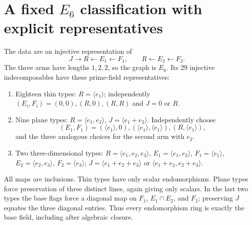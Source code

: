 \documentclass[11pt]{article}
\begin{document}
\section{A fixed $E_6$ classification with explicit representatives}
The data are an injective representation of
\[
 J\longrightarrow R\longleftarrow E_1\longleftarrow F_1,
 \qquad R\longleftarrow E_2\longleftarrow F_2.\tag{4}
\]
The three arms have lengths $1,2,2$, so the graph is $E_6$.
Its 29 injective indecomposables have these prime-field representatives:
\begin{enumerate}
\item Eighteen thin types: $R=\langle e_1\rangle$; independently
$(E_i,F_i)=(0,0),(R,0),(R,R)$ and $J=0$ or $R$.
\item Nine plane types: $R=\langle e_1,e_2\rangle$,
$J=\langle e_1+e_2\rangle$. Independently choose
\[
 (E_1,F_1)=(\langle e_1\rangle,0),
 (\langle e_1\rangle,\langle e_1\rangle),
 (R,\langle e_1\rangle),
\]
and the three analogous choices for the second arm with $e_2$.
\item Two three-dimensional types: $R=\langle e_1,e_2,e_3\rangle$,
$E_1=\langle e_1,e_2\rangle$, $F_1=\langle e_1\rangle$,
$E_2=\langle e_2,e_3\rangle$, $F_2=\langle e_3\rangle$;
$J=\langle e_1+e_2+e_3\rangle$ or
$\langle e_1+e_2,e_2+e_3\rangle$.
\end{enumerate}
All maps are inclusions. Thin types have only scalar endomorphisms.
Plane types force preservation of three distinct lines, again giving
only scalars. In the last two types the base flags force a diagonal map
on $F_1$, $E_1\cap E_2$, and $F_2$; preserving $J$ equates the three
diagonal entries. Thus every endomorphism ring is exactly the base
field, including after algebraic closure.
\end{document}
